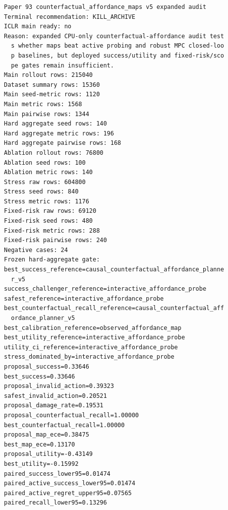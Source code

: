 \documentclass{article}
\begin{document}
\begin{verbatim}
Paper 93 counterfactual_affordance_maps v5 expanded audit
Terminal recommendation: KILL_ARCHIVE
ICLR main ready: no
Reason: expanded CPU-only counterfactual-affordance audit test
  s whether maps beat active probing and robust MPC closed-loo
  p baselines, but deployed success/utility and fixed-risk/sco
  pe gates remain insufficient.
Main rollout rows: 215040
Dataset summary rows: 15360
Main seed-metric rows: 1120
Main metric rows: 1568
Main pairwise rows: 1344
Hard aggregate seed rows: 140
Hard aggregate metric rows: 196
Hard aggregate pairwise rows: 168
Ablation rollout rows: 76800
Ablation seed rows: 100
Ablation metric rows: 140
Stress raw rows: 604800
Stress seed rows: 840
Stress metric rows: 1176
Fixed-risk raw rows: 69120
Fixed-risk seed rows: 480
Fixed-risk metric rows: 288
Fixed-risk pairwise rows: 240
Negative cases: 24
Frozen hard-aggregate gate:
best_success_reference=causal_counterfactual_affordance_planne
  r_v5
success_challenger_reference=interactive_affordance_probe
safest_reference=interactive_affordance_probe
best_counterfactual_recall_reference=causal_counterfactual_aff
  ordance_planner_v5
best_calibration_reference=observed_affordance_map
best_utility_reference=interactive_affordance_probe
utility_ci_reference=interactive_affordance_probe
stress_dominated_by=interactive_affordance_probe
proposal_success=0.33646
best_success=0.33646
proposal_invalid_action=0.39323
safest_invalid_action=0.20521
proposal_damage_rate=0.19531
proposal_counterfactual_recall=1.00000
best_counterfactual_recall=1.00000
proposal_map_ece=0.38475
best_map_ece=0.13170
proposal_utility=-0.43149
best_utility=-0.15992
paired_success_lower95=0.01474
paired_active_success_lower95=0.01474
paired_active_regret_upper95=0.07565
paired_recall_lower95=0.13296
\end{verbatim}
\end{document}
